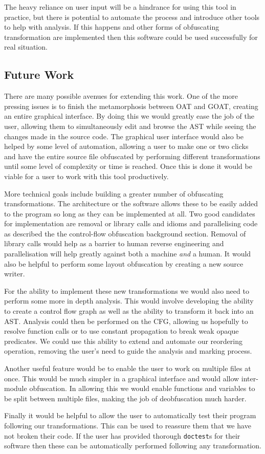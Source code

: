 \documentclass[twoside,a4paper]{report}
\begin{document}
The heavy reliance on user input will be a hindrance for using this tool in practice, but there is potential to automate the process and introduce other
tools to help with analysis. If this happens and other forms of obfuscating transformation are implemented then this software could be used successfully
for real situation.

\subsection{Future Work}

There are many possible avenues for extending this work. One of the more pressing issues is to finish the metamorphosis between OAT and GOAT, creating an entire
graphical interface. By doing this we would greatly ease the job of the user, allowing them to simultaneously edit and browse the AST while seeing the changes
made in the source code. The graphical user interface would also be helped by some level of automation, allowing a user to make one or two clicks and have the
entire source file obfuscated by performing different transformations until some level of complexity or time is reached. Once this is done it would be viable
for a user to work with this tool productively.

More technical goals include building a greater number of obfuscating transformations. The architecture or the software allows these to be easily
added to the program so long as they can be implemented at all. Two good candidates for implementation are removal or library calls and idioms and
parallelising code as described the the control-flow obfuscation background section. Removal of library calls would help as a barrier to human reverse
engineering and parallelisation will help greatly against both a machine \textit{and} a human. It would also be helpful to perform some layout obfuscation
by creating a new source writer.

For the ability to implement these new transformations we would also need to perform some more in depth analysis. This would involve developing the ability
to create a control flow graph as well as the ability to transform it back into an AST. Analysis could then be performed on the CFG, allowing us hopefully
to resolve function calls or to use constant propagation to break weak opaque predicates. We could use this ability to extend and automate our reordering
operation, removing the user's need to guide the analysis and marking process.

Another useful feature would be to enable the user to work on multiple files at once. This would be much simpler in a graphical interface and would allow
inter-module obfuscation. In allowing this we would enable functions and variables to be split between multiple files, making the job of deobfuscation much
harder. 

Finally it would be helpful to allow the user to automatically test their program following our transformations. This can be used to reassure them that we
have not broken their code. If the user has provided thorough \texttt{doctest}s for their software then these can be automatically performed following any
transformation.



\end{document}
